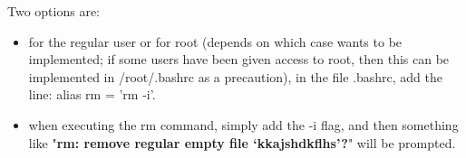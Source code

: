 \documentclass[paper=a4, fontsize=11pt]{scrartcl} %
\numberwithin{equation}{section} %
\numberwithin{figure}{section} %
\numberwithin{table}{section} %
\begin{document}
\begin{onehalfspacing}
Two options are:

\begin{itemize}
\item for the regular user or for root (depends on which case wants to be implemented; if some users have been given access to root, then this can be implemented in /root/.bashrc as a precaution), in the file .bashrc, add the line: alias rm = 'rm -i'.
\item when executing the rm command, simply add the -i flag, and then something like "\textbf{rm: remove regular empty file `kkajshdkflhs'?}" will be prompted.
\end{itemize}


\end{onehalfspacing}
\end{document}

